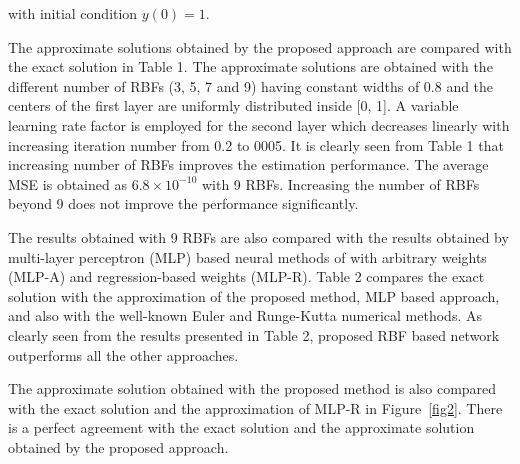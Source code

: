 \noindent
with initial condition $y(0)=1$.

The approximate solutions obtained by the proposed approach are compared with the exact solution in Table 1. The approximate solutions are obtained with the different number of RBFs (3, 5, 7 and 9) having constant widths of 0.8 and the centers of the first layer are uniformly distributed inside [0, 1]. A variable learning rate factor is employed for the second layer which decreases linearly with increasing iteration number from 0.2 to 0005. It is clearly seen from Table 1 that increasing number of RBFs improves the estimation performance. The average MSE is obtained as $6.8\times10^{-10}$ with 9 RBFs. Increasing the number of RBFs beyond 9 does not improve the performance significantly.

The results obtained with 9 RBFs are also compared with the results obtained by multi-layer perceptron (MLP) based neural methods of \cite{Mal1} with arbitrary weights (MLP-A) and regression-based weights (MLP-R). Table 2 compares the exact solution with the approximation of the proposed method, MLP based approach, and also with the well-known Euler and Runge-Kutta numerical methods. As clearly seen from the results presented in Table 2, proposed RBF based network outperforms all the other approaches.

The approximate solution obtained with the proposed method is also compared with the exact solution and the approximation of MLP-R in Figure~\ref{fig2}. There is a perfect agreement with the exact solution and the approximate solution obtained by the proposed approach.


